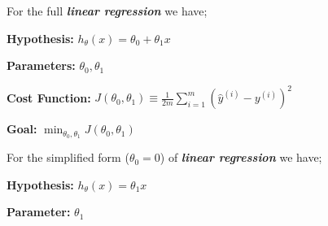 \documentclass{article}
\begin{document}
\hspace{-0.675cm} For the full \textbf{\textit{linear regression}} we have;

\vspace{0.35cm}

\hspace{-0.675cm} \textbf{Hypothesis:} \begin{math} h_{\theta} (x) = \theta_0 + \theta_1 x \end{math}

\vspace{0.15cm}

\hspace{-0.675cm} \textbf{Parameters:} \begin{math} \theta_0, \theta_1 \end{math}

\vspace{0.15cm}

\hspace{-0.675cm} \textbf{Cost Function:} \begin{math} J(\theta_0, \theta_1) \equiv \frac{1}{2m} \sum_{i=1}^{m}  ( \hat{y}^{(i)} - y^{(i)} )^2 \end{math}

\vspace{0.15cm}

\hspace{-0.675cm} \textbf{Goal:} \begin{math} \min_{\theta_0, \theta_1} J(\theta_0, \theta_1)  \end{math}

\vspace{0.35cm}

\hspace{-0.675cm} For the simplified form (\begin{math} \theta_0 = 0 \end{math}) of \textbf{\textit{linear regression}} we have;

\vspace{0.35cm}

\hspace{-0.675cm} \textbf{Hypothesis:} \begin{math} h_{\theta} (x) = \theta_1 x \end{math}

\vspace{0.15cm}

\hspace{-0.675cm} \textbf{Parameter:} \begin{math} \theta_1 \end{math}
\end{document}
